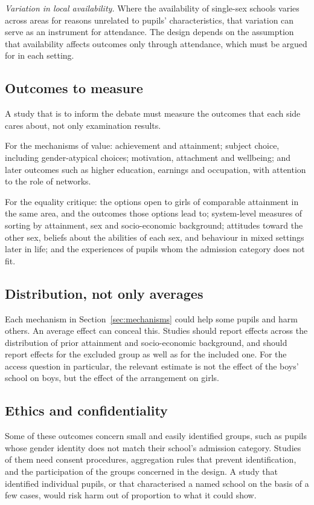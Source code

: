 \documentclass[11pt]{article}
\newcounter{mech}
\begin{document}
\emph{Variation in local availability.} Where the availability of single-sex schools varies across areas for reasons unrelated to pupils' characteristics, that variation can serve as an instrument for attendance. The design depends on the assumption that availability affects outcomes only through attendance, which must be argued for in each setting.

\subsection{Outcomes to measure}

A study that is to inform the debate must measure the outcomes that each side cares about, not only examination results.

For the mechanisms of value: achievement and attainment; subject choice, including gender-atypical choices; motivation, attachment and wellbeing; and later outcomes such as higher education, earnings and occupation, with attention to the role of networks.

For the equality critique: the options open to girls of comparable attainment in the same area, and the outcomes those options lead to; system-level measures of sorting by attainment, sex and socio-economic background; attitudes toward the other sex, beliefs about the abilities of each sex, and behaviour in mixed settings later in life; and the experiences of pupils whom the admission category does not fit.

\subsection{Distribution, not only averages}

Each mechanism in Section~\ref{sec:mechanisms} could help some pupils and harm others. An average effect can conceal this. Studies should report effects across the distribution of prior attainment and socio-economic background, and should report effects for the excluded group as well as for the included one. For the access question in particular, the relevant estimate is not the effect of the boys' school on boys, but the effect of the arrangement on girls.

\subsection{Ethics and confidentiality}

Some of these outcomes concern small and easily identified groups, such as pupils whose gender identity does not match their school's admission category. Studies of them need consent procedures, aggregation rules that prevent identification, and the participation of the groups concerned in the design. A study that identified individual pupils, or that characterised a named school on the basis of a few cases, would risk harm out of proportion to what it could show.
\end{document}
